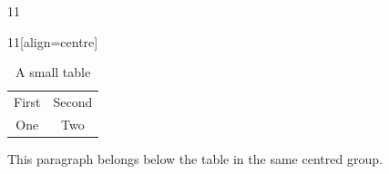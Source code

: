 \documentclass[paper=A4]{ropas-poster}
\begin{document}
\begin{postergrid}{1}{1}
  \begin{posterblock}{1}{1}[align=centre]
    \begin{table}[t]
      \caption{A small table}
      \begin{tabular}{cc}
        First & Second \\
        One & Two
      \end{tabular}
    \end{table}
    This paragraph belongs below the table in the same centred group.
  \end{posterblock}
\end{postergrid}
\end{document}
